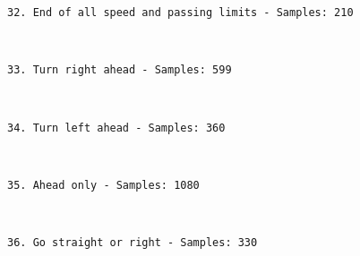 \documentclass[11pt]{article}
\begin{document}
    \begin{Verbatim}[commandchars=\\\{\}]
32. End of all speed and passing limits - Samples: 210

    \end{Verbatim}

    \begin{center}
    \end{center}
    { \hspace*{\fill} \\}
    
    \begin{Verbatim}[commandchars=\\\{\}]
33. Turn right ahead - Samples: 599

    \end{Verbatim}

    \begin{center}
    \end{center}
    { \hspace*{\fill} \\}
    
    \begin{Verbatim}[commandchars=\\\{\}]
34. Turn left ahead - Samples: 360

    \end{Verbatim}

    \begin{center}
    \end{center}
    { \hspace*{\fill} \\}
    
    \begin{Verbatim}[commandchars=\\\{\}]
35. Ahead only - Samples: 1080

    \end{Verbatim}

    \begin{center}
    \end{center}
    { \hspace*{\fill} \\}
    
    \begin{Verbatim}[commandchars=\\\{\}]
36. Go straight or right - Samples: 330

    \end{Verbatim}
\end{document}
